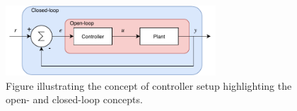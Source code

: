 \documentclass[../../main.tex]{subfiles}
\begin{document}




\begin{figure}[H]
    \centering
    \includegraphics[width=0.7\textwidth]{Sections/Miscellaneous/Images/Open_closed_Diagram.pdf}
    \caption{Figure illustrating the concept of controller setup highlighting the open- and closed-loop concepts. }
    \label{fig:Open_Close_loop}
\end{figure}
\end{document}
